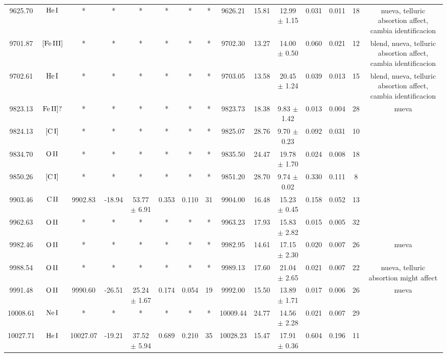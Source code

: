 \documentclass{article}
\begin{document}
\begin{table*}
\begin{adjustbox}{width=\textwidth}
\begin{tabular}{ccccccccccccccc}
9625.70 & $\mbox{He}\thinspace \mbox{I}$ & * & * & * & * & * & * & 9626.21 & 15.81 & 12.99 $\pm$ 1.15 & 0.031 & 0.011 & 18 &  nueva, telluric absortion affect, cambia identificacion \\
9701.87 & $\mbox{[Fe}\thinspace \mbox{III]}$ & * & * & * & * & * & * & 9702.30 & 13.27 & 14.00 $\pm$ 0.50 & 0.060 & 0.021 & 12 &  blend, nueva, telluric absortion affect, cambia identificacion \\
9702.61 & $\mbox{He}\thinspace \mbox{I}$ & * & * & * & * & * & * & 9703.05 & 13.58 & 20.45 $\pm$ 1.24 & 0.039 & 0.013 & 15 &  blend, nueva, telluric absortion affect, cambia identificacion \\
9823.13 & $\mbox{Fe}\thinspace \mbox{II]?}$ & * & * & * & * & * & * & 9823.73 & 18.38 & 9.83 $\pm$ 1.42 & 0.013 & 0.004 & 28 &  nueva \\
9824.13 & $\mbox{[C}\thinspace \mbox{I]}$ & * & * & * & * & * & * & 9825.07 & 28.76 & 9.70 $\pm$ 0.23 & 0.092 & 0.031 & 10 &  \\
9834.70 & $\mbox{O}\thinspace \mbox{II}$ & * & * & * & * & * & * & 9835.50 & 24.47 & 19.78 $\pm$ 1.70 & 0.024 & 0.008 & 18 &  \\
9850.26 & $\mbox{[C}\thinspace \mbox{I]}$ & * & * & * & * & * & * & 9851.20 & 28.70 & 9.74 $\pm$ 0.02 & 0.330 & 0.111 & 8 &  \\
9903.46 & $\mbox{C}\thinspace \mbox{II}$ & 9902.83 & -18.94 & 53.77 $\pm$ 6.91 & 0.353 & 0.110 & 31 & 9904.00 & 16.48 & 15.23 $\pm$ 0.45 & 0.158 & 0.052 & 13 &  \\
9962.63 & $\mbox{O}\thinspace \mbox{II}$ & * & * & * & * & * & * & 9963.23 & 17.93 & 15.83 $\pm$ 2.82 & 0.015 & 0.005 & 32 &  \\
9982.46 & $\mbox{O}\thinspace \mbox{II}$ & * & * & * & * & * & * & 9982.95 & 14.61 & 17.15 $\pm$ 2.30 & 0.020 & 0.007 & 26 &  nueva \\
9988.54 & $\mbox{O}\thinspace \mbox{II}$ & * & * & * & * & * & * & 9989.13 & 17.60 & 21.04 $\pm$ 2.65 & 0.021 & 0.007 & 22 &  nueva, telluric absortion might affect \\
9991.48 & $\mbox{O}\thinspace \mbox{II}$ & 9990.60 & -26.51 & 25.24 $\pm$ 1.67 & 0.174 & 0.054 & 19 & 9992.00 & 15.50 & 13.89 $\pm$ 1.71 & 0.017 & 0.006 & 26 &  nueva \\
10008.61 & $\mbox{Ne}\thinspace \mbox{I}$ & * & * & * & * & * & * & 10009.44 & 24.77 & 14.56 $\pm$ 2.28 & 0.021 & 0.007 & 29 &  \\
10027.71 & $\mbox{He}\thinspace \mbox{I}$ & 10027.07 & -19.21 & 37.52 $\pm$ 5.94 & 0.689 & 0.210 & 35 & 10028.23 & 15.47 & 17.91 $\pm$ 0.36 & 0.604 & 0.196 & 11 &  \\

\end{tabular}
\end{adjustbox}
\end{table*}
\end{document}

